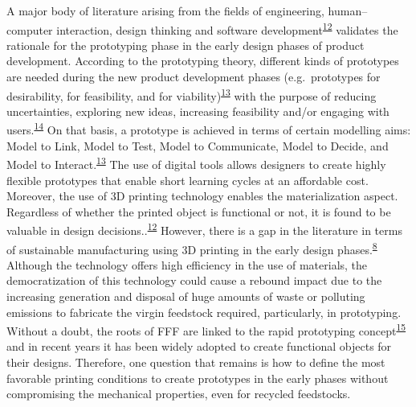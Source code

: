 \documentclass[
  12pt]{article}
\begin{document}
A major body of literature arising from the fields of engineering, human--computer interaction, design thinking and software development\textsuperscript{\protect\hyperlink{ref-Elverum2016}{12}} validates the rationale for the prototyping phase in the early design phases of product development.
According to the prototyping theory, different kinds of prototypes are needed during the new product development phases (e.g.~prototypes for desirability, for feasibility, and for viability)\textsuperscript{\protect\hyperlink{ref-Menold2017}{13}} with the purpose of reducing uncertainties, exploring new ideas, increasing feasibility and/or engaging with users.\textsuperscript{\protect\hyperlink{ref-Hansen2020}{14}}
On that basis, a prototype is achieved in terms of certain modelling aims: Model to Link, Model to Test, Model to Communicate, Model to Decide, and Model to Interact.\textsuperscript{\protect\hyperlink{ref-Menold2017}{13}}
The use of digital tools allows designers to create highly flexible prototypes that enable short learning cycles at an affordable cost.
Moreover, the use of 3D printing technology enables the materialization aspect. Regardless of whether the printed object is functional or not, it is found to be valuable in design decisions..\textsuperscript{\protect\hyperlink{ref-Elverum2016}{12}}
However, there is a gap in the literature in terms of sustainable manufacturing using 3D printing in the early design phases.\textsuperscript{\protect\hyperlink{ref-Peng2018}{8}}
Although the technology offers high efficiency in the use of materials, the democratization of this technology could cause a rebound impact due to the increasing generation and disposal of huge amounts of waste or polluting emissions to fabricate the virgin feedstock required, particularly, in prototyping.
Without a doubt, the roots of FFF are linked to the rapid prototyping concept\textsuperscript{\protect\hyperlink{ref-Campbell2012}{15}} and in recent years it has been widely adopted to create functional objects for their designs. Therefore, one question that remains is how to define the most favorable printing conditions to create prototypes in the early phases without compromising the mechanical properties, even for recycled feedstocks.
\end{document}
